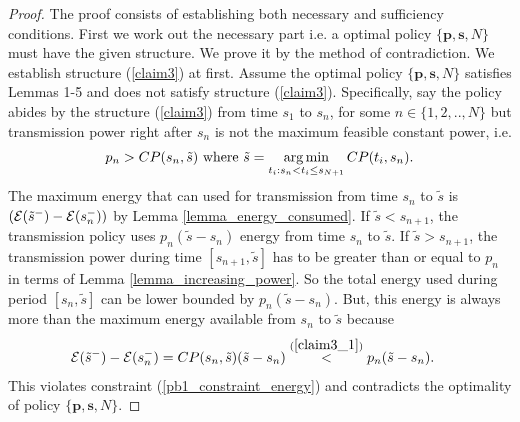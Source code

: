 \begin{proof}
The proof consists of establishing both necessary and sufficiency conditions. First we work out the necessary part i.e. a optimal policy $\{\textbf{p},\textbf{s},N\}$ must have the given structure. We prove it by the method of  contradiction. We establish structure (\ref{claim3}) at first. Assume the optimal policy $\{\textbf{p},\textbf{s},N\}$ satisfies Lemmas 1-5 and does not satisfy structure (\ref{claim3}). Specifically, say the policy abides by the  structure (\ref{claim3}) from time $s_{1}$ to $s_n$, for some $n\in \{1,2,..,N\}$ but transmission power right after $s_n$ is not the maximum feasible constant power, i.e.
\begin{align}
p_n>CP(s_n,\tilde{s})\text{ where } \tilde{s}=\argmin_{t_i: s_n < t_i \le s_{N+1}} CP(t_i,s_n).\label{claim3_1}
\end{align}
The maximum energy that can used for transmission from time $s_{n}$ to $\tilde{s}$ is $\left(\mathcal{E}(\tilde{s}^-)-\mathcal{E}(s_{n}^-)\right)$ by Lemma \ref{lemma_energy_consumed}. If $\tilde{s}<s_{n+1}$, the transmission policy uses $p_n(\tilde{s}-s_{n})$ energy from time $s_n$ to $\tilde{s}$. If $\tilde{s}>s_{n+1}$, the transmission power during time $[s_{n+1},\tilde{s}]$ has to be greater than or equal to $p_n$ in terms of Lemma \ref{lemma_increasing_power}. So the total energy used during period $[s_n,\tilde{s}]$ can be lower bounded by $p_n(\tilde{s}-s_{n})$. But, this energy is always more than the maximum energy available from $s_{n}$ to $\tilde{s}$ because
\begin{align}
&\nonumber\mathcal{E}(\tilde{s}^-)-\mathcal{E}(s_{n}^-)=CP(s_n,\tilde{s})(\tilde{s}-s_{n})\stackrel{(\ref{claim3_1})}{<}p_n(\tilde{s}-s_{n}).
\end{align}
This violates constraint (\ref{pb1_constraint_energy}) and contradicts the optimality of policy $\{\textbf{p},\textbf{s},N\}$.
 

\end{proof}
